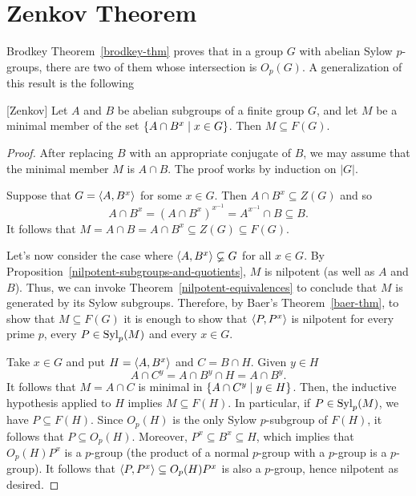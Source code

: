 \section{Zenkov Theorem}

Brodkey Theorem~\ref{brodkey-thm} proves that in a group $G$ with abelian Sylow $p$-groups, there are two of them whose intersection is $O_p(G)$. A generalization of this result is the following

\begin{thm}\label{zenkov}
    {\rm[Zenkov]} Let\/ $A$ and\/ $B$ be abelian subgroups of a finite group\/ $G$, and let\/ $M$ be a minimal member of the set\/ $\{A \cap B^x \mid x \in G\}$. Then\/ $M\subseteq F(G)$.
\end{thm}

\begin{proof} After replacing $B$ with an appropriate conjugate of $B$, we may assume that the minimal member $M$ is $A\cap B$. The proof works by induction on $|G|$.

Suppose that $G=\langle A,B^x\rangle$ for some $x\in G$. Then $A\cap B^x\subseteq Z(G)$ and so
$$
    A\cap B^x=(A\cap B^x)^{x^{-1}}=A^{x^{-1}}\!\!\cap B\subseteq B.
$$
It follows that $M=A\cap B = A\cap B^x\subseteq Z(G)\subseteq F(G)$.

Let's now consider the case where $\langle A,B^x\rangle\varsubsetneq G$ for all $x\in G$. By Proposition~\ref{nilpotent-subgroups-and-quotients}, $M$ is nilpotent (as well as $A$ and $B$). Thus, we can invoke Theorem~\ref{nilpotent-equivalences} to conclude that $M$ is generated by its Sylow subgroups. Therefore, by Baer's Theorem~\ref{baer-thm}, to show that $M\subseteq F(G)$ it is enough to show that $\langle P,P^x\rangle$ is nilpotent for every prime $p$, every $P\in{\rm Syl}_p(M)$ and every $x\in G$.

Take $x\in G$ and put $H=\langle A,B^x\rangle$ and $C=B\cap H$. Given $y\in H$
$$
    A\cap C^y = A\cap B^y\cap H= A\cap B^y.
$$
It follows that $M=A\cap C$ is minimal in $\{A\cap C^y\mid y\in H\}$. Then, the inductive hypothesis applied to $H$ implies $M\subseteq F(H)$. In particular, if $P\in{\rm Syl}_p(M)$, we have $P\subseteq F(H)$. Since $O_p(H)$ is the only Sylow $p$-subgroup of $F(H)$, it follows that $P\subseteq O_p(H)$. Moreover, $P^x\subseteq B^x\subseteq H$, which implies that $O_p(H)P^x$ is a $p$-group (the product of a normal $p$-group with a $p$-group is a $p$-group). It follows that $\langle P,P^x\rangle\subseteq O_p(H)P^x$ is also a $p$-group, hence nilpotent as desired.  \end{proof}

